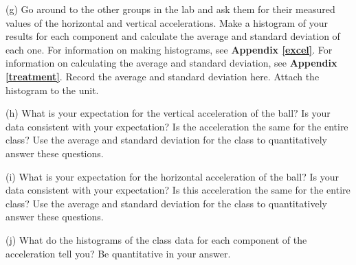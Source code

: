 (g) Go around to the other groups in the lab and ask them for their measured values of the horizontal and vertical accelerations.
Make a histogram of your results for each component and calculate the average and standard deviation of each one.
For information on making histograms, see \textbf{Appendix \ref{excel}}. For information on calculating the average and
standard deviation, see \textbf{Appendix \ref{treatment}}. Record the average and standard deviation here.
Attach the histogram to the unit.
\vspace{30mm}

(h) What is your expectation for the vertical acceleration of the ball? Is your data consistent with your expectation?
Is the acceleration the same for the entire class? 
Use the average and standard deviation for the class to quantitatively answer these questions.
\vspace{25mm}

(i) What is your expectation for the horizontal acceleration of the ball?  Is your data consistent with your expectation?
Is this acceleration the same for the entire class? 
Use the average and standard deviation for the class to quantitatively answer these questions.
\vspace{25mm}

(j) What do the histograms of the class data for each component of the acceleration tell you? Be quantitative in your answer.
\vspace{20mm}

